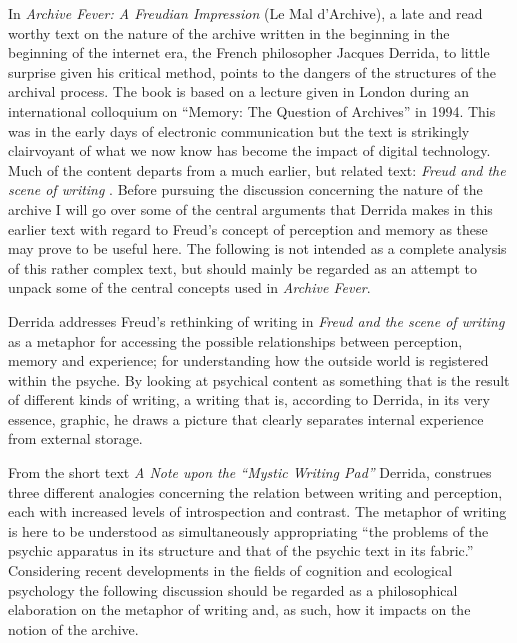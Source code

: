 \documentclass[11pt,a4paper]{article}
\begin{document}
In \emph{Archive Fever: A Freudian Impression} (Le Mal d'Archive), a late and read worthy text on the nature of the archive written in the beginning in the beginning of the internet era, the French philosopher Jacques Derrida, to little surprise given his critical method, points to the dangers of the structures of the archival process. The book is based on a lecture given in London during an international colloquium on ``Memory: The Question of Archives'' in 1994. This was in the early days of electronic communication but the text is strikingly clairvoyant of what we now know has become the impact of digital technology. Much of the content departs from a much earlier, but related text: \emph{Freud and the scene of writing} \citep{der78}. Before pursuing the discussion concerning the nature of the archive I will go over some of the central arguments that Derrida makes in this earlier text with regard to Freud's concept of perception and memory as these may prove to be useful here. The following is not intended as a complete analysis of this rather complex text, but should mainly be regarded as an attempt to unpack some of the central concepts used in \emph{Archive Fever}.

Derrida addresses Freud's rethinking of writing in \emph{Freud and the scene of writing} as a metaphor for accessing the possible relationships between perception, memory and experience; for understanding how the outside world is registered within the psyche. By looking at psychical content as something that is the result of different kinds of writing, a writing that is, according to Derrida, in its very essence, graphic, he draws a picture that clearly separates internal experience from external storage.


From the short text \emph{A Note upon the “Mystic Writing Pad”} \citep[Included in:][p. 207-12]{freud1997} Derrida,  construes three different analogies concerning the relation between writing and perception, each with increased levels of introspection and contrast. The metaphor of writing is here to be understood as simultaneously appropriating ``the problems of the psychic apparatus in its structure and that of the psychic text in its fabric.'' \citep[p. 259]{der78} Considering recent developments in the fields of cognition and ecological psychology the following discussion should be regarded as a philosophical elaboration on the metaphor of writing and, as such, how it impacts on the notion of the archive.
\end{document}
